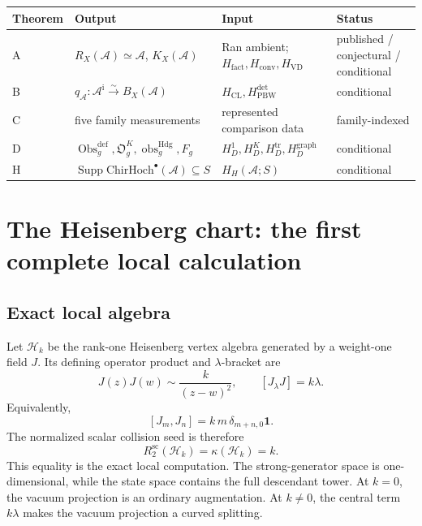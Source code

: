 \documentclass[11pt]{article}
\theoremstyle{plain}
\theoremstyle{definition}
\theoremstyle{remark}
\newcommand{\cA}{\mathcal{A}}
\newcommand{\cH}{\mathcal{H}}
\newcommand{\ChirHoch}{\mathrm{ChirHoch}}
\begin{document}
\begin{center}
\small
\renewcommand{\arraystretch}{1.15}
\begin{tabular}{llll}
\toprule
\textbf{Theorem} & \textbf{Output} & \textbf{Input}
 & \textbf{Status} \\
\midrule
A & \(R_X(\cA)\simeq\cA\), \(K_X(\cA)\)
 & Ran ambient; \(H_{\mathrm{fact}},H_{\mathrm{conv}},H_{\mathrm{VD}}\)
 & published / conjectural / conditional \\
B & \(q_\cA\colon\cA^{\mathrm i}\xrightarrow{\sim}B_X(\cA)\)
 & \(H_{\mathrm{CL}},H_{\mathrm{PBW}}^{\mathrm{det}}\)
 & conditional \\
C & five family measurements
 & represented comparison data
 & family-indexed \\
D & \(\operatorname{Obs}^{\mathrm{def}}_g,\mathfrak O_g^K,
       \operatorname{obs}^{\mathrm{Hdg}}_g,F_g\)
 & \(H_D^1,H_D^K,H_D^{\mathrm{tr}},H_D^{\mathrm{graph}}\)
 & conditional \\
H & \(\operatorname{Supp}\ChirHoch^\bullet(\cA)\subseteq S\)
 & \(H_H(\cA;S)\)
 & conditional \\
\bottomrule
\end{tabular}
\end{center}


\section{The Heisenberg chart: the first complete local calculation}
\label{sec:heisenberg}

\subsection{Exact local algebra}

Let \(\cH_k\) be the rank-one Heisenberg vertex algebra generated by a
weight-one field \(J\).  Its defining operator product and
\(\lambda\)-bracket are
\begin{equation}\label{eq:heis-ope}
 J(z)J(w)\sim\frac{k}{(z-w)^2},
 \qquad
 [J_\lambda J]=k\lambda .
\end{equation}
Equivalently,
\[
 [J_m,J_n]=k\,m\,\delta_{m+n,0}\mathbf1 .
\]
The normalized scalar collision seed is therefore
\begin{equation}\label{eq:heis-rmatrix}
 R_2^{\mathrm{sc}}(\cH_k)=\kappa(\cH_k)=k.
\end{equation}
This equality is the exact local computation.  The strong-generator
space is one-dimensional, while the state space contains the full
descendant tower.  At \(k=0\), the vacuum projection is an ordinary
augmentation.  At \(k\neq0\), the central term \(k\lambda\) makes the
vacuum projection a curved splitting.
\end{document}
